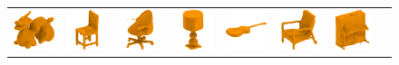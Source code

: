 \begin{figure}[t]
\begin{tabular}{cccccccc}
\includegraphics[width=.14\linewidth]{dsp/figs/dragon_deep_binary_8_0.png} &
\includegraphics[width=.14\linewidth]{dsp/figs/chair_0013_deep_binary_8_0.png} &
\includegraphics[width=.14\linewidth]{dsp/figs/chair_0200_deep_binary_8_0.png} &
\includegraphics[width=.14\linewidth]{dsp/figs/lamp_0050_deep_binary_8_0.png} &
\includegraphics[width=.14\linewidth]{dsp/figs/guitar_0100_deep_binary_8_0.png} &
\includegraphics[width=.14\linewidth]{dsp/figs/chair_0011_deep_binary_8_0.png} &
\includegraphics[width=.14\linewidth]{dsp/figs/piano_0050_deep_binary_8_0.png} \\


\end{tabular}
\end{figure}
